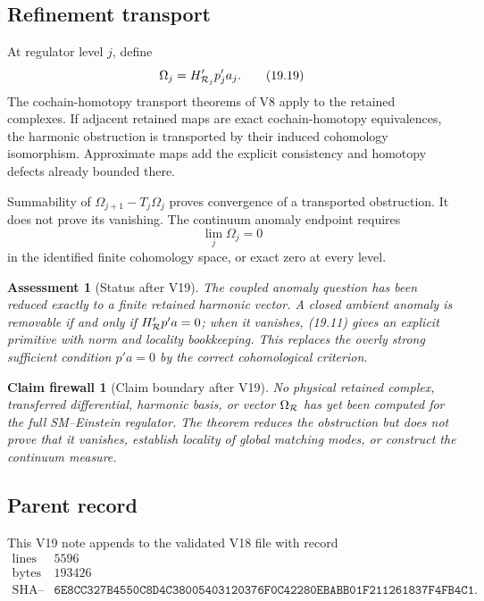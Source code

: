 \documentclass[11pt]{article}
\newtheorem{firewall}[theorem]{Claim firewall}
\newtheorem{assessment}[theorem]{Assessment}
\theoremstyle{remark}
\begin{document}
\subsection{Refinement transport}

At regulator level \(j\), define
\[
                         \Omega_j
 =H_{{\cal R}_j}'p_j'a_j.                                  \tag{19.19}
\]
The cochain-homotopy transport theorems of V8 apply to the retained
complexes.  If adjacent retained maps are exact cochain-homotopy
equivalences, the harmonic obstruction is transported by their
induced cohomology isomorphism.  Approximate maps add the explicit
consistency and homotopy defects already bounded there.

Summability of
\(\Omega_{j+1}-T_j\Omega_j\) proves convergence of a transported
obstruction.  It does not prove its vanishing.  The continuum anomaly
endpoint requires
\[
                         \lim_j\Omega_j=0                   \tag{19.20}
\]
in the identified finite cohomology space, or exact zero at every
level.

\begin{assessment}[Status after V19]
\label{ass:v12v19-status}
The coupled anomaly question has been reduced exactly to a finite
retained harmonic vector.  A closed ambient anomaly is removable if
and only if \(H_{\cal R}'p'a=0\); when it vanishes, (19.11) gives an
explicit primitive with norm and locality bookkeeping.  This replaces
the overly strong sufficient condition \(p'a=0\) by the correct
cohomological criterion.
\end{assessment}

\begin{firewall}[Claim boundary after V19]
\label{fire:v12v19-claim}
No physical retained complex, transferred differential, harmonic
basis, or vector \(\Omega_{\cal R}\) has yet been computed for the
full SM--Einstein regulator.  The theorem reduces the obstruction but
does not prove that it vanishes, establish locality of global matching
modes, or construct the continuum measure.
\end{firewall}

\subsection{Parent record}

This V19 note appends to the validated V18 file with record
\[
\begin{array}{c|c}
\text{lines}&5596\\
\text{bytes}&193426\\
\text{SHA--256}&
\texttt{6E8CC327B4550C8D4C38005403120376F0C42280EBABB01F211261837F4FB4C1}.
\end{array}
\]
\end{document}
